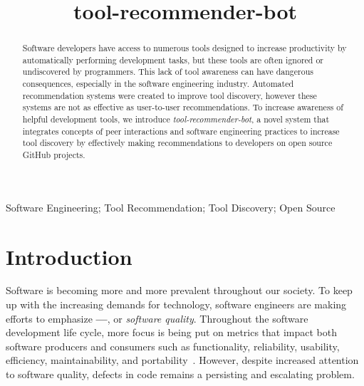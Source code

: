 \documentclass[conference]{IEEEtran}
\newcommand{\tool}{tool-recommender-bot}
\begin{document}

\title{\tool}

\author{
}

\maketitle
\begin{abstract}
Software developers have access to numerous tools designed to increase productivity by automatically performing development tasks, but these tools are often ignored or undiscovered by programmers. This lack of tool awareness can have dangerous consequences, especially in the software engineering industry. Automated recommendation systems were created to improve tool discovery, however these systems are not as effective as user-to-user recommendations. To increase awareness of helpful development tools, we introduce \textit{\tool}, a novel system that integrates concepts of peer interactions and software engineering practices to increase tool discovery by effectively making recommendations to developers on open source GitHub projects.
\end{abstract}

\begin{IEEEkeywords}
Software Engineering; Tool Recommendation; Tool Discovery; Open Source
\end{IEEEkeywords}

\section{Introduction}

Software is becoming more and more prevalent throughout our society. To keep up with the increasing demands for technology, software engineers are making efforts to emphasize \textbf{---}, or \textit{software quality}. Throughout the software development life cycle, more focus is being put on metrics that impact both software producers and consumers such as functionality, reliability, usability, efficiency, maintainability, and portability~\cite{KitchenhamQualityTarget}. However, despite increased attention to software quality, defects in code remains a persisting and escalating problem. 
\end{document}

